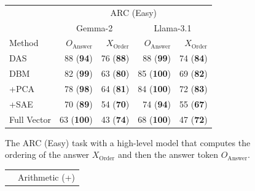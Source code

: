\documentclass{article}
\theoremstyle{plain}
\theoremstyle{definition}
\theoremstyle{remark}
\newcommand{\variabletrack}{causal variable localization track}
\newcommand{\order}{X_{\text{Order}}}
\newcommand{\answer}{O_{\text{Answer}}}
\begin{document}
\begin{table}[t]
    \caption{Baseline results for the \variabletrack. In each table, the first row is the task, the second row is the model, and the third row is the causal variable. 
    For Arithmetic, MCQA, and ARC (Easy), we report interchange intervention accuracy, i.e., the proportion of aligned interventions on the causal model and deep learning model that result in the same output token(s); higher is better. For each method of aligning a causal variable to LM features, we report the mean across counterfactual datasets and layers in the low-level model. In parenthesis and bold, we report the best alignment across all layers. For IOI, we report the mean-squared error between the causal model logit and the deep learning model logit; lower is better.
    See App.~\ref{app:causalvariabletracktaskdetails} for more detailed results by task.
    }
    \label{tab:causalgraph}
\small
\centering
\begin{subfigure}[b]{0.52\textwidth}
\centering
  \begin{tabular}{lrrrr}
    \toprule
     & \multicolumn{4}{c}{ARC (Easy)} \\
    \cmidrule(lr){2-5}
 & \multicolumn{2}{c}{Gemma-2} & \multicolumn{2}{c}{Llama-3.1} \\
    \cmidrule(lr){2-3}\cmidrule(lr){4-5}
    Method & $\answer$ & $\order$ & $\answer$ & $\order$ \\
   \midrule
    DAS & 88 (\textbf{94}) & 76 (\textbf{88}) & 88 (\textbf{99}) & 74 (\textbf{84}) \\
    DBM & 82 (\textbf{99}) & 63 (\textbf{80}) & 85 (\textbf{100}) & 69 (\textbf{82}) \\
    +PCA & 78 (\textbf{98}) & 64 (\textbf{81}) & 84 (\textbf{100}) & 72 (\textbf{83}) \\
    +SAE & 70 (\textbf{89}) & 54 (\textbf{70}) & 74 (\textbf{94}) & 55 (\textbf{67}) \\
    Full Vector & 63 (\textbf{100}) & 43 (\textbf{74}) & 68 (\textbf{100}) & 47 (\textbf{72}) \\
    \bottomrule
  \end{tabular}
  \caption{The ARC (Easy) task with a high-level model that computes the ordering of the answer $\order$ and then the answer token $\answer$.}
  \label{tab:results-arc}
\end{subfigure}
\hfill
\begin{subfigure}[b]{0.45\textwidth}
    \centering
  \begin{tabular}{lrr}
    \toprule
     & \multicolumn{2}{c}{Arithmetic (+)} \\

\end{tabular}
\end{subfigure}
\end{table}
\end{document}
